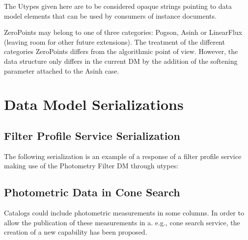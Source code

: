 \documentclass[11pt,a4paper]{ivoa}
\begin{document}
\begin{appendices}

The Utypes given here are to be considered opaque strings pointing to data model
elements that can be used by consumers of instance documents.

ZeroPoints may belong to one of three categories: Pogson, Asinh or LinearFlux 
(leaving room for other future extensions). The treatment of the different 
categories ZeroPoints differs from the algorithmic point of view.
However, the data structure only differs in the current DM by the addition 
of the softening parameter attached to the Asinh case.

\par

\section{Data Model Serializations} \label{serialization}
\subsection{Filter Profile Service Serialization} \label{serializationfilter}

    
The following serialization is an example of a response of a filter profile 
service making use of the Photometry Filter DM through utypes:
\par


\subsection{Photometric Data in Cone Search}
Catalogs could include photometric measurements in some columns. In order 
to allow the publication of these measurements in a. e.g., cone search 
service, the creation of a new capability has been proposed.
\par


\end{appendices}
\end{document}
